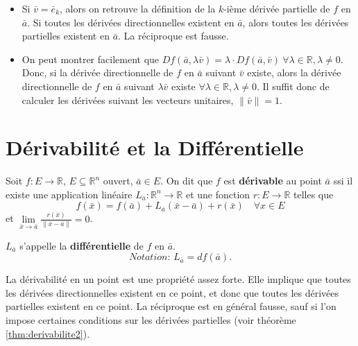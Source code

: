 \documentclass{report}
\newcommand*{\norm}[1]{\lVert#1\rVert}
\begin{document}
\begin{remark}
	\begin{itemize}	
		\item Si $\bar v = \bar e_k$, alors on retrouve la définition de la $k$-ième dérivée partielle de $f$ en $\bar a$. Si toutes les dérivées directionnelles existent en $\bar a$, alors toutes les dérivées partielles existent en $\bar a$. La réciproque est fausse.
		\item On peut montrer facilement que $D f(\bar a, \lambda \bar v) = \lambda \cdot D f(\bar a, \bar v) \ \forall \lambda \in \mathbb R, \lambda \neq 0$. Donc, si la dérivée directionnelle de $f$ en $\bar a$ suivant $\bar v$ existe, alors la dérivée directionnelle de $f$ en $\bar a$ suivant $\lambda \bar v$ existe $\forall \lambda \in \mathbb R, \lambda \neq 0$. Il suffit donc de calculer les dérivées suivant les vecteurs unitaires, $\norm{\bar v} = 1$.
	\end{itemize}
\end{remark}

\section{Dérivabilité et la Différentielle}

\begin{defn}
	Soit $f : E \to \mathbb R$, $E \subseteq \mathbb R^n$ ouvert, $\bar a \in E$. On dit que $f$ est \textbf{dérivable} au point $\bar a$ ssi il existe une application linéaire $L_{\bar a} : \mathbb R^n \to \mathbb R$ et une fonction $r : E \to \mathbb R$ telles que
	\begin{equation}
		f(\bar x) = f(\bar a) + L_{\bar a}(\bar x - \bar a) + r(\bar x) \quad \forall x \in E
	\end{equation}
	et $\lim\limits_{\bar x \to \bar a} \frac{r(\bar x)}{\norm{\bar x - \bar a}} = 0$. \par
	$L_{\bar a}$ s'appelle la \textbf{différentielle} de $f$ en $\bar a$.
	\begin{equation}
		\textit{Notation: } L_{\bar a} = d f(\bar a).
	\end{equation}
\end{defn}
\begin{remark}
	La dérivabilité en un point est une propriété assez forte. Elle implique que toutes les dérivées directionnelles existent en ce point, et donc que toutes les dérivées partielles existent en ce point. La réciproque est en général fausse, sauf si l'on impose certaines conditions sur les dérivées partielles (voir théorème \ref{thm:derivabilite2}).
\end{remark}
\end{document}
